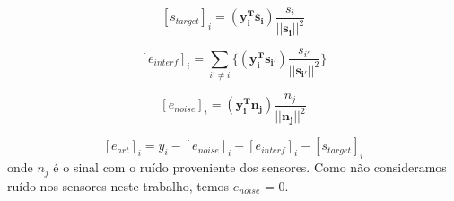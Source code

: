     \begin{equation}
        \label{eq:star}
         [s_{target}]_i  = (\mathbf{y_i^Ts_i})\frac{s_i}{||\mathbf{s_i}||^2}
    \end{equation}
    
    \medskip
    
    \begin{equation}
        \label{eq:eint}
         [e_{interf}]_i  = \sum_{i' \neq i} \{(\mathbf{y_i^Ts_{i'}})\frac{s_{i'}}{||\mathbf{s_{i'}}||^2}\}
    \end{equation}
    
    \medskip
    
    \begin{equation}
        \label{eq:enoise}
         [e_{noise}]_i  = (\mathbf{y_i^Tn_j})\frac{n_j}{||\mathbf{n_j}||^2}
    \end{equation}
    
    \medskip
    
        \begin{equation}
        \label{eq:eart}
         [e_{art}]_i  = y_i -  [e_{noise}]_i -  [e_{interf}]_i - [s_{target}]_i 
    \end{equation}
    onde $n_j$ é o sinal com o ruído proveniente dos sensores. Como não consideramos ruído nos sensores neste trabalho, temos $e_{noise}$ = 0.
    
    